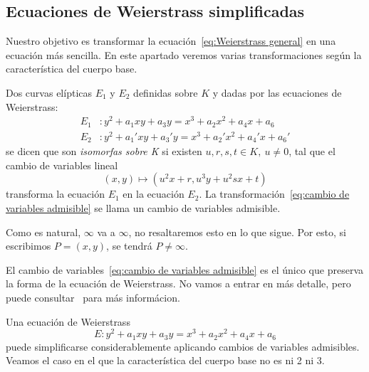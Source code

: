\subsection{Ecuaciones de Weierstrass simplificadas}
\label{sub:Ecuaciones de Weierstrass simplificadas}

Nuestro objetivo es transformar la ecuación~\eqref{eq:Weierstrass general} en una ecuación más sencilla. En este apartado veremos varias transformaciones según la característica del cuerpo base.

\begin{definicion}
	Dos curvas elípticas $E_1$ y $E_2$ definidas sobre $K$ y dadas por las ecuaciones de Weierstrass:
	\begin{align*}
		E_1 &: y^2 + a_1 x y + a_3 y = x^3 + a_2 x^2 + a_4 x + a_6 \\
		E_2 &: y^2 + a_1' x y + a_3' y = x^3 + a_2' x^2 + a_4' x + a_6'
	\end{align*}
	se dicen que son \emph{isomorfas sobre K} si existen $u, r, s, t \in K,\ u \neq 0$, tal que el cambio de variables lineal
	\begin{equation}\label{eq:cambio de variables admisible}
	(x, y) \mapsto (u^2 x + r, u^3 y + u^2 s x + t)
	\end{equation}
	transforma la ecuación $E_1$ en la ecuación $E_2$. La transformación~\eqref{eq:cambio de variables admisible} se llama un cambio de variables admisible.
\end{definicion}

Como es natural, $\infty$ va a $\infty$, no resaltaremos esto en lo que sigue. Por esto, si escribimos $P = (x, y)$, se tendrá $P \neq \infty$.

El cambio de variables~\eqref{eq:cambio de variables admisible} es el único que preserva la forma de la ecuación de Weierstrass. No vamos a entrar en más detalle, pero puede consultar~\cite[prop. III.3.1b]{Silverman:2009} para más informácion.

Una ecuación de Weierstrass
$$
E:  y^2 + a_1 x y + a_3 y = x^3 + a_2 x^2 + a_4 x + a_6
$$
puede simplificarse considerablemente aplicando cambios de variables admisibles. Veamos el caso en el que la característica del cuerpo base no es ni 2 ni 3.

